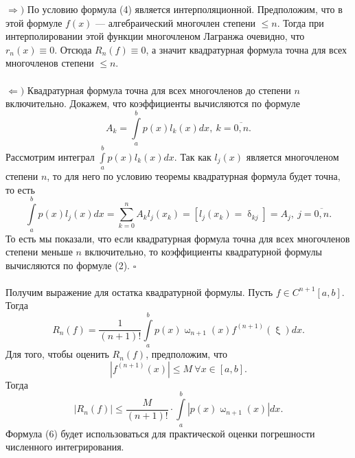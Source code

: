 \documentclass[a4paper, 12pt]{report}
\numberwithin{equation}{section}
\newenvironment{Proof} %
{\par\noindent{$\blacklozenge$}} %
{\hfill$\scriptstyle\square$}
\renewcommand{\leq}{\leqslant}
\renewcommand{\delta}{\updelta}
\renewcommand{\omega}{\upomega}
\renewcommand{\xi}{\upxi}
\begin{document}
	 \begin{Proof}
	 	$\Rightarrow)$ По условию формула (4) является интерполяционной. Предположим, что в этой формуле $f(x)$ --- алгебраический многочлен степени $\leq n$. Тогда при интерполировании этой функции многочленом Лагранжа очевидно, что $r_n(x) \equiv 0$. Отсюда $R_n(f) \equiv 0$, а значит квадратурная формула точна для всех многочленов степени $\leq n$.\\\\
	 	$\Leftarrow)$ Квадратурная формула точна для всех многочленов до степени $n$ включительно. Докажем, что коэффициенты вычисляются по формуле $$A_k = \int\limits_a^b p(x)l_k(x)dx,\ k = \overline{0,n}.$$
	 	Рассмотрим интеграл $\int\limits_a^b p(x)l_k(x)dx.$
	 	Так как $l_j(x)$ является многочленом степени $n$, то для него по условию теоремы квадратурная формула будет точна, то есть $$\int\limits_a^b p(x)l_j(x)dx = \sum_{k=0}^n A_k l_j(x_k) = \left[l_j(x_k) = \delta_{kj}\right] = A_j,\ j = \overline{0,n}.$$
	 	То есть мы показали, что если квадратурная формула точна для всех многочленов степени меньше $n$ включительно, то коэффициенты квадратурной формулы вычисляются по формуле (2).
	 \end{Proof}\\\\
	 Получим выражение для остатка квадратурной формулы. Пусть $f\in C^{n+1}[a,b]$. Тогда 
	 \begin{equation}
	 	R_n(f) = \dfrac{1}{(n+1)!} \int\limits_a^b p(x)\omega_{n+1}(x)f^{(n+1)}(\xi)dx.
	 \end{equation}
	 Для того, чтобы оценить $R_n(f)$, предположим, что $$|f^{(n+1)}(x)|\leq M\ \forall x \in [a,b].$$
	 Тогда 
	 \begin{equation}
	 	|R_n(f)| \leq \dfrac{M}{(n+1)!}\cdot \int\limits_a^b |p(x)\omega_{n+1}(x)| dx.
	 \end{equation}
	 Формула (6) будет использоваться для практической оценки погрешности численного интегрирования.
\end{document}
